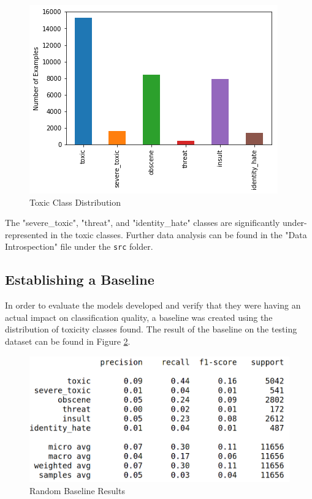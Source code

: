 \documentclass{article}
\begin{document}
{{	  \begin{figure}[h]
		  \centering
		  \includegraphics[width=\textwidth]{toxic-distribution.png}
		  \caption{Toxic Class Distribution}
		  \label{fig:toxic-dist}
	  \end{figure}
  }
  The "severe\_toxic", "threat", and "identity\_hate" classes are significantly
  under-represented in the toxic classes. Further data analysis can be found in
  the "Data Introspection" file under the \texttt{src} folder.

  \subsection{Establishing a Baseline}{
	  In order to evaluate the models developed and verify that they were having
	  an actual impact on classification quality, a baseline was created using the
	  distribution of toxicity classes found. The result of the baseline on the
	  testing dataset can be found in Figure \ref{fig:rand-base}.

	  \begin{figure}[h]
		  \centering
		  \includegraphics[width=\textwidth]{random-baseline.png}
		  \caption{Random Baseline Results}
		  \label{fig:rand-base}
	  \end{figure}
  }

 }
\end{document}
